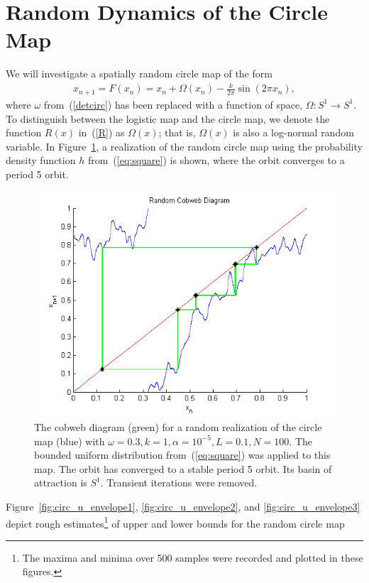 \section{Random Dynamics of the Circle Map}
We will investigate a spatially random circle map of the form
\begin{align}\label{randcirc}
x_{n+1}= F(x_n) =  x_n + \Omega(x_n) - \frac{k}{2\pi}\sin(2\pi x_n),
\end{align}
where $\omega$ from~(\ref{detcirc}) has been replaced with a function
of space, $\Omega:S^1\to S^1$. To distinguish between the logistic map
and the circle map, we denote the function $R(x)$ in~(\ref{R}) as
$\Omega(x)$; that is, $\Omega(x)$ is also a log-normal random
variable. In Figure~\ref{fig:rcircstable}, a realization of the
random circle map using the probability density function $h$
from~(\ref{eq:square}) is shown, where the orbit converges to a period 5 orbit. 
\begin{figure}[!h]
\caption[Random circle map, stable orbit under the uniform distribution]{The cobweb
  diagram (green) for a random realization of the circle map (blue) with $\omega =
  0.3, k=1, \alpha = 10^{-5},L=0.1, N=100$. The bounded uniform distribution
  from~(\ref{eq:square}) was applied to this map. The orbit
  has converged to a stable period 5 orbit. Its basin of attraction is
  $S^1$. Transient iterations were removed.}\label{fig:rcircstable}
	\begin{center}
		\includegraphics[scale=0.7]{figs/randcirc_cobweb.png}
	\end{center}
\end{figure}
Figure~\ref{fig:circ_u_envelope1}, \ref{fig:circ_u_envelope2}, and \ref{fig:circ_u_envelope3} depict rough estimates\footnote{The
  maxima and minima over 500 samples were recorded and plotted in
  these figures.} of upper and lower bounds for the random circle map

